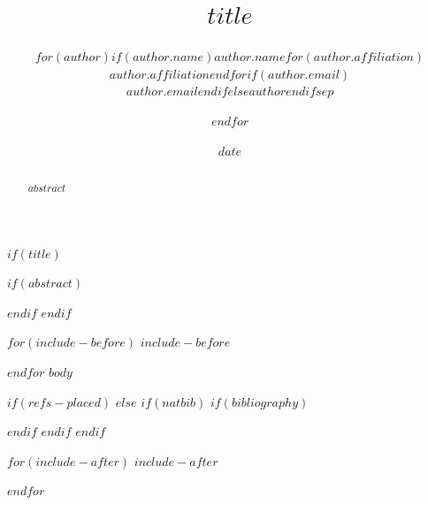 \documentclass[$if(fontsize)$$fontsize$$else$11pt$endif$,letterpaper]{article}
\title{$title$}
\author{$for(author)$$if(author.name)$$author.name$$for(author.affiliation)$ \\ \normalsize $author.affiliation$$endfor$$if(author.email)$ \\ \small\texttt{$author.email$}$endif$$else$$author$$endif$$sep$\and $endfor$}
\date{$date$}
\begin{document}
$if(title)$
\maketitle
\thispagestyle{preprintfirst}
$if(abstract)$
\begin{abstract}
$abstract$
\end{abstract}
$endif$
$endif$

$for(include-before)$
$include-before$

$endfor$
$body$

$if(refs-placed)$
$else$
$if(natbib)$
$if(bibliography)$

$endif$
$endif$
$endif$

$for(include-after)$
$include-after$

$endfor$
\end{document}
